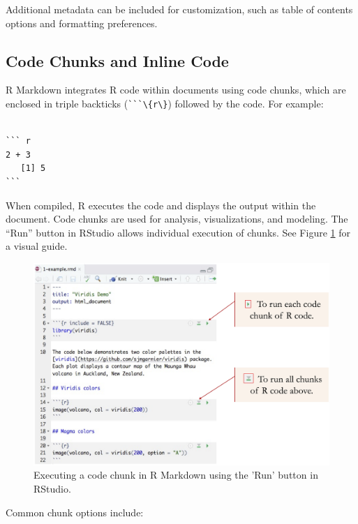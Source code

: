 \documentclass[
  11pt,
]{book}
\newcommand{\passthrough}[1]{#1}
\theoremstyle{definition}
\theoremstyle{definition}
\theoremstyle{definition}
\theoremstyle{definition}
\theoremstyle{remark}
\begin{document}
Additional metadata can be included for customization, such as table of contents options and formatting preferences.

\subsection*{Code Chunks and Inline Code}\label{code-chunks-and-inline-code}


R Markdown integrates R code within documents using code chunks, which are enclosed in triple backticks (\passthrough{\lstinline!```\{r\}!}) followed by the code. For example:

\begin{lstlisting}

``` r
2 + 3
   [1] 5
```
\end{lstlisting}

When compiled, R executes the code and displays the output within the document. Code chunks are used for analysis, visualizations, and modeling. The ``Run'' button in RStudio allows individual execution of chunks. See Figure \ref{fig:run-chunk} for a visual guide.

\begin{figure}[H]

{\centering \includegraphics[width=0.9\linewidth]{images/ch1_run-chunk} 

}

\caption{Executing a code chunk in R Markdown using the 'Run' button in RStudio.}\label{fig:run-chunk}
\end{figure}

Common chunk options include:
\end{document}
